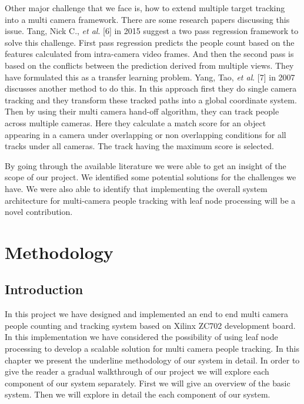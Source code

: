 \documentclass[12pt,a4paper]{report}
\begin{document}
Other major challenge that we face is, how to extend multiple target tracking into a multi camera framework. There are some research papers discussing this issue. Tang, Nick C., \textit{et al}. [6] in 2015 suggest a two pass regression framework to solve this challenge. First pass regression predicts the people count based on the features calculated from intra-camera video frames. And then the second pass is based on the conflicts between the prediction derived from multiple views. They have formulated this as a transfer learning problem. Yang, Tao, \textit{et al}. [7] in 2007 discusses another method to do this. In this approach first they do single camera tracking and they transform these tracked paths into a global coordinate system. Then by using their multi camera hand-off algorithm, they can track people across multiple cameras. Here they calculate a match score for an object appearing in a camera under overlapping or non overlapping conditions for all tracks under all cameras. The track having the maximum score is selected.\vspace{0.3cm}

By going through the available literature we were able to get an insight of the scope of our project. We identified some potential solutions for the challenges we have. We were also able to identify that implementing the overall system architecture for multi-camera people tracking with leaf node processing will be a novel contribution. 



\chapter{Methodology}
\section{Introduction}
In this project we have designed and implemented an end to end multi camera people counting and tracking system based on Xilinx ZC702 development board. In this implementation we have considered the possibility of using leaf node processing to develop a scalable solution for multi camera people tracking. In this chapter we present the underline methodology of our system in detail.
In order to give the reader a gradual walkthrough of our project we will explore each component of our system separately. First we will give an overview of the basic system. Then we will explore in detail the each component of our system. 
\end{document}
